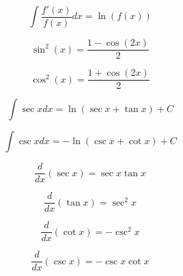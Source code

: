 \documentclass[a4paper,9pt]{scrartcl}
\begin{document}
    \begin{displaymath}
        \int \frac{f'(x)}{f(x)} dx = \ln(f(x))
    \end{displaymath}

    \begin{displaymath}
        \sin^2(x) = \frac{1-\cos(2x)}{2}
    \end{displaymath}

    \begin{displaymath}
        \cos^2(x) = \frac{1+\cos(2x)}{2}
    \end{displaymath}

    \begin{displaymath}
        \int{\sec{x}}dx = \ln{(\sec{x} + \tan{x})} + C
    \end{displaymath}

    \begin{displaymath}
        \int{\csc{x}}dx = -\ln({\csc{x} + \cot{x}}) + C
    \end{displaymath}

    \begin{displaymath}
        \frac{d}{dx}(\sec{x}) = \sec{x}\tan{x}
    \end{displaymath}

    \begin{displaymath}
        \frac{d}{dx}(\tan{x}) = \sec^2{x}
    \end{displaymath}

    \begin{displaymath}
        \frac{d}{dx}(\cot{x}) = -\csc^2{x}
    \end{displaymath}

    \begin{displaymath}
        \frac{d}{dx}(\csc{x}) = -\csc{x}\cot{x}
    \end{displaymath}
\end{document}
